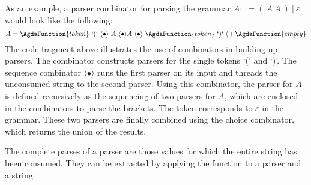 \documentclass[12pt,a4paper,twoside,openright]{report}
\newcommand{\F}{\AgdaFunction}
\begin{document}
As an example, a parser combinator for parsing the grammar $A ::= (\ A\ A\ )\ |\ \varepsilon $ would look like the following:
$$A = \F{token}\ `(`\ \langle\bullet\rangle\ A\ \langle\bullet\rangle A\ \langle\bullet\rangle\ \F{token}\ `)`\ \langle|\rangle\ \F{empty}$$
The code fragment above illustrates the use of combinators in building up parsers. The \F{token} combinator constructs parsers for the single tokens `(' and `)'. The sequence combinator $\langle\bullet\rangle$ runs the first parser on its input and threads the unconsumed string to the second parser. Using this combinator, the parser for $A$ is defined recursively as the sequencing of two parsers for $A$, which are enclosed in the \F{token} combinators to parse the brackets. The \F{empty} token corresponds to $\varepsilon$ in the grammar. These two parsers are finally combined using the choice combinator, which returns the union of the results.

The complete parses of a parser are those values for which the entire string has been consumed. They can be extracted by applying the \F{parse} function to a parser and a string:

\begin{code}
\> \AgdaSymbol{:} \AgdaSymbol{\{} \AgdaSymbol{:} \AgdaSymbol{\}}   \AgdaSymbol{(}  \AgdaSymbol{)}   \<%
\\
\> \AgdaInductiveConstructor{[]} \AgdaSymbol{=} \AgdaInductiveConstructor{[]}\<%
\\
\> \AgdaSymbol{((} \AgdaInductiveConstructor{,} \AgdaInductiveConstructor{[]}\AgdaSymbol{)}  \AgdaSymbol{)} \AgdaSymbol{=}    \<%
\\
\>  \AgdaInductiveConstructor{,}     \AgdaSymbol{)} \AgdaSymbol{=}  \<%
\\
%
\\
\> \AgdaSymbol{:} \AgdaSymbol{\{} \AgdaSymbol{:} \AgdaSymbol{\}}        \<%
\\
\> \AgdaSymbol{(} \AgdaSymbol{)}  \AgdaSymbol{=}  \AgdaSymbol{(} \AgdaSymbol{)}\<%
\end{code}
\end{document}
